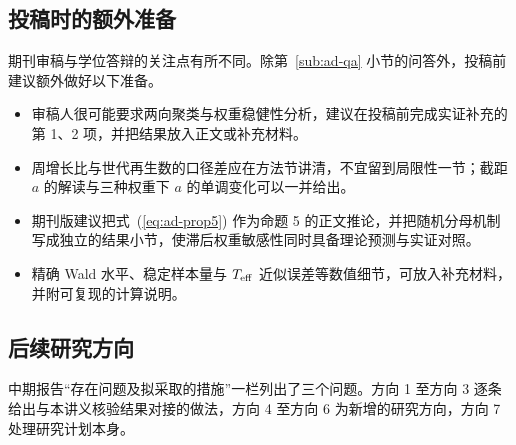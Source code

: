 \subsection{投稿时的额外准备}

期刊审稿与学位答辩的关注点有所不同。除第~\ref{sub:ad-qa} 小节的问答外，投稿前建议额外做好以下准备。
\begin{itemize}
\item 审稿人很可能要求两向聚类与权重稳健性分析，建议在投稿前完成实证补充的第 1、2 项，并把结果放入正文或补充材料。
\item 周增长比与世代再生数的口径差应在方法节讲清，不宜留到局限性一节；截距 $a$ 的解读与三种权重下 $a$ 的单调变化可以一并给出。
\item 期刊版建议把式~(\ref{eq:ad-prop5}) 作为命题 5 的正文推论，并把随机分母机制写成独立的结果小节，使滞后权重敏感性同时具备理论预测与实证对照。
\item 精确 Wald 水平、稳定样本量与 $T_{\rm eff}$ 近似误差等数值细节，可放入补充材料，并附可复现的计算说明。
\end{itemize}

\subsection{后续研究方向}\label{sub:ad-future}

中期报告“存在问题及拟采取的措施”一栏列出了三个问题。方向 1 至方向 3 逐条给出与本讲义核验结果对接的做法，方向 4 至方向 6 为新增的研究方向，方向 7 处理研究计划本身。

